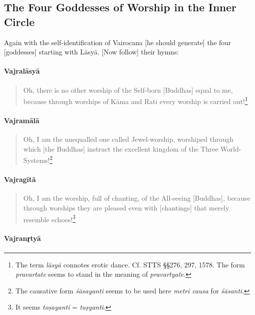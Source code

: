 \documentclass[11pt]{book}
\newcommand{\skt}[1]{\emph{#1}}
\begin{document}
\subsection{The Four Goddesses of Worship in the Inner Circle}

Again with the self-identification of Vairocana [he should generate] the four [goddesses] starting with Lāsyā. [Now follow] their hymns:

\paragraph{Vajralāsyā}

\begin{verse}
Oh, there is no other worship of the Self-born [Buddhas] equal to me, because through worships of Kāma and Rati every worship is carried out!\footnote{The term \skt{lāsyā} connotes erotic dance. Cf. STTS §§276, 297, 1578. The form \skt{pravartate} seems to stand in the meaning of \skt{pravartyate}.}\\
\end{verse}

\paragraph{Vajramālā}

\begin{verse}
Oh, I am the unequalled one called Jewel-worship, worshiped through which [the Buddhas] instruct the excellent kingdom of the Three World-Systems!\footnote{The causative form \skt{śāsayanti} seems to be used here \skt{metri causa} for \skt{śāsanti}.}\\
\end{verse}

\paragraph{Vajragītā}

\begin{verse}
Oh, I am the worship, full of chanting, of the All-seeing [Buddhas], because through worships they are pleased even with [chantings] that merely resemble echoes!\footnote{It seems \skt{toṣayanti} = \skt{tuṣyanti}.}\\
\end{verse}

\paragraph{Vajranr̥tyā}
\end{document}
